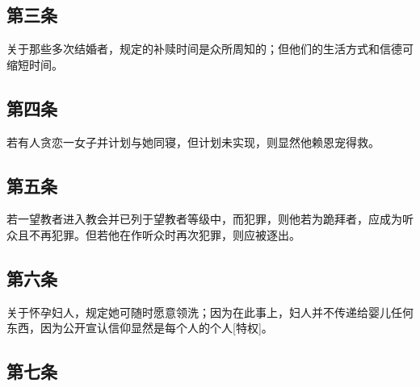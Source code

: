 \subsection{第三条}

关于那些多次结婚者，规定的补赎时间是众所周知的；但他们的生活方式和信德可缩短时间。\par


\subsection{第四条}

若有人贪恋一女子并计划与她同寝，但计划未实现，则显然他赖恩宠得救。\par


\subsection{第五条}

若一望教者进入教会并已列于望教者等级中，而犯罪，则他若为跪拜者，应成为听众且不再犯罪。但若他在作听众时再次犯罪，则应被逐出。\par

\par


\subsection{第六条}

关于怀孕妇人，规定她可随时愿意领洗；因为在此事上，妇人并不传递给婴儿任何东西，因为公开宣认信仰显然是每个人的个人[特权]。\par


\subsection{第七条}

